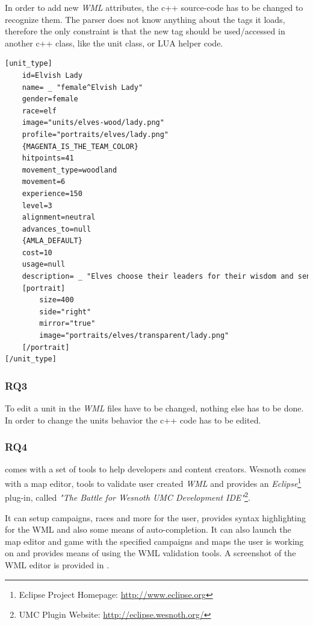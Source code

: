 In order to add new \textit{WML} attributes, the c++ source-code has to be changed to recognize them. The \BOW{} parser
does not know anything about the tags it loads, therefore the only constraint is that the new tag should be used/accessed
in another c++ class, like the unit class, or LUA helper code.

\begin{lstlisting}[language=XML,caption=A basic (shortened) \BOW{} unit definition in WML, label=wesnothwml]
[unit_type]
    id=Elvish Lady
    name= _ "female^Elvish Lady"
    gender=female
    race=elf
    image="units/elves-wood/lady.png"
    profile="portraits/elves/lady.png"
    {MAGENTA_IS_THE_TEAM_COLOR}
    hitpoints=41
    movement_type=woodland
    movement=6
    experience=150
    level=3
    alignment=neutral
    advances_to=null
    {AMLA_DEFAULT}
    cost=10
    usage=null
    description= _ "Elves choose their leaders for their wisdom and sensitivity to the balance of universal forces; foresight is what has protected them in times of uncertainty. Their just reign is rewarded by the unflagging fealty of their people, which is the greatest gift for which any ruler could ask."
    [portrait]
        size=400
        side="right"
        mirror="true"
        image="portraits/elves/transparent/lady.png"
    [/portrait]
[/unit_type]
\end{lstlisting}

\subsubsection{RQ3}
To edit a unit in \BOW{} the \textit{WML} files have to be changed, nothing else has to be done. In order to change the
units behavior the c++ code has to be edited.

\subsubsection{RQ4}
\BOW{} comes with a set of tools to help developers and content creators. Wesnoth comes with a  map editor, tools to
validate user created \textit{WML} and provides an \textit{Eclipse}\footnote{Eclipse Project Homepage:
\url{http://www.eclipse.org}} plug-in, called \textit{"The Battle for Wesnoth UMC Development IDE"}\footnote{UMC Plugin
Website: \url{http://eclipse.wesnoth.org/}}.

It can setup
campaigns, races and more for the user, provides syntax highlighting for the WML and also some means of auto-completion. 
It can also launch the map editor and game with the specified campaigns and maps the user is working on and provides
means of using the WML validation tools. A screenshot of the WML editor is provided in .

